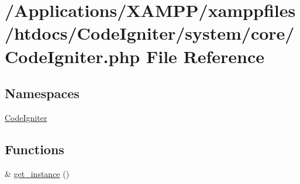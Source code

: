 \hypertarget{_code_igniter_8php}{}\section{/\+Applications/\+X\+A\+M\+P\+P/xamppfiles/htdocs/\+Code\+Igniter/system/core/\+Code\+Igniter.php File Reference}
\label{_code_igniter_8php}
\subsection*{Namespaces}
\begin{DoxyCompactItemize}
\item 
 \mbox{\hyperlink{namespace_code_igniter}{Code\+Igniter}}
\end{DoxyCompactItemize}
\subsection*{Functions}
\begin{DoxyCompactItemize}
\item 
\& \mbox{\hyperlink{_code_igniter_8php_a185483844bd20a0e80955460d66d2199}{get\+\_\+instance}} ()
\end{DoxyCompactItemize}
